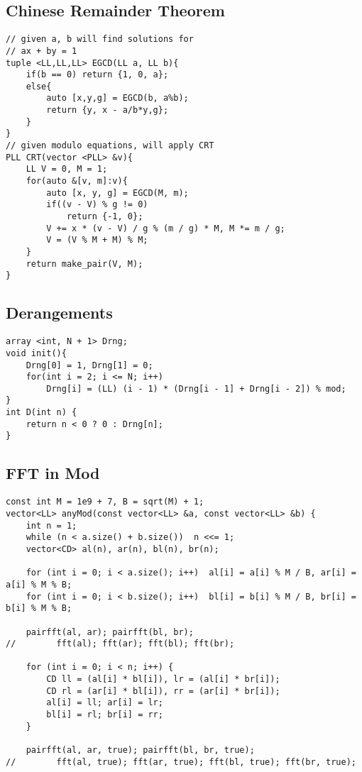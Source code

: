 \documentclass[10pt,a4paper,onesided]{article}
\begin{document}
\begin{multicols*}{3}
\begin{lstlisting}
\end{lstlisting}
\subsection{Chinese Remainder Theorem}
\begin{lstlisting}
// given a, b will find solutions for
// ax + by = 1
tuple <LL,LL,LL> EGCD(LL a, LL b){
    if(b == 0) return {1, 0, a};
    else{
        auto [x,y,g] = EGCD(b, a%b);
        return {y, x - a/b*y,g};
    }
}
// given modulo equations, will apply CRT
PLL CRT(vector <PLL> &v){
    LL V = 0, M = 1;
    for(auto &[v, m]:v){
        auto [x, y, g] = EGCD(M, m);
        if((v - V) % g != 0)
            return {-1, 0};
        V += x * (v - V) / g % (m / g) * M, M *= m / g;
        V = (V % M + M) % M;
    }
    return make_pair(V, M);
}\end{lstlisting}
\subsection{Derangements}
\begin{lstlisting}
array <int, N + 1> Drng;
void init(){
    Drng[0] = 1, Drng[1] = 0;
    for(int i = 2; i <= N; i++)
        Drng[i] = (LL) (i - 1) * (Drng[i - 1] + Drng[i - 2]) % mod;
}
int D(int n) { 
    return n < 0 ? 0 : Drng[n];
}\end{lstlisting}
\subsection{FFT in Mod}
\begin{lstlisting}
const int M = 1e9 + 7, B = sqrt(M) + 1;
vector<LL> anyMod(const vector<LL> &a, const vector<LL> &b) {
    int n = 1;
    while (n < a.size() + b.size())  n <<= 1;
    vector<CD> al(n), ar(n), bl(n), br(n);

    for (int i = 0; i < a.size(); i++)  al[i] = a[i] % M / B, ar[i] = a[i] % M % B;
    for (int i = 0; i < b.size(); i++)  bl[i] = b[i] % M / B, br[i] = b[i] % M % B;

    pairfft(al, ar); pairfft(bl, br);
//        fft(al); fft(ar); fft(bl); fft(br);

    for (int i = 0; i < n; i++) {
        CD ll = (al[i] * bl[i]), lr = (al[i] * br[i]);
        CD rl = (ar[i] * bl[i]), rr = (ar[i] * br[i]);
        al[i] = ll; ar[i] = lr;
        bl[i] = rl; br[i] = rr;
    }

    pairfft(al, ar, true); pairfft(bl, br, true);
//        fft(al, true); fft(ar, true); fft(bl, true); fft(br, true);


\end{lstlisting}
\end{multicols*}
\end{document}
